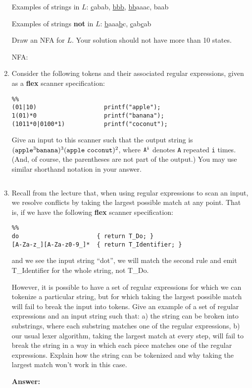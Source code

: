 \documentclass[11pt]{article}
\begin{document}
\begin{enumerate}
Examples of strings in $L$: \underline{c}abab, \underline{bbb}, \underline{bb}aaac, baab

Examples of strings \textbf{not} in $L$: \underline{b}aaa\underline{b}c, \underline{c}ab\underline{c}ab

Draw an NFA for $L$.  Your solution should not have more than 10 states.

NFA:

\newpage

\item Consider the following tokens and their associated regular expressions, given as a \textbf{flex} scanner specification:

\begin{lstlisting}
%%
(01|10)                   printf("apple");
1(01)*0                   printf("banana");
(1011*0|0100*1)           printf("coconut");
\end{lstlisting}

Give an input to this scanner such that the output string is $\tt (apple^{\rm 3}  banana)^{\rm 3}(apple\ coconut)^{\rm 2}$, where $\tt A^i$ denotes {\tt A} repeated {\tt i} times.   (And, of course, the parentheses are not part of the output.)  You may use similar shorthand notation in your answer.

\[
\]


\newpage

\item Recall from the lecture that, when using regular expressions to scan an input, we resolve conflicts by taking the largest possible match at any point. That is, if we have the following \textbf{flex} scanner specification:

\begin{lstlisting}
%%
do                      { return T_Do; }
[A-Za-z_][A-Za-z0-9_]*  { return T_Identifier; }
\end{lstlisting}

and we see the input string ``dot'', we will match the second rule and emit T\_Identifier for the whole string, not T\_Do.

However, it is possible to have a set of regular expressions for which we can tokenize a particular string, but for which taking the largest possible match will fail to break the input into tokens. Give an example of a set of regular expressions and an input string such that: a) the string can be broken into substrings, where each substring matches one of the regular expressions, b) our usual lexer algorithm, taking the largest match at every step, will fail to break the string in a way in which each piece matches one of the regular expressions. Explain how the string can be tokenized and why taking the largest match won't work in this case.


\textbf{Answer:} %

\end{enumerate}
\end{document}
